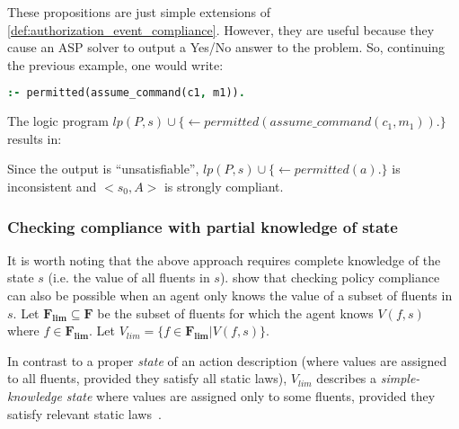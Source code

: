 These propositions are just simple extensions of \cref{def:authorization_event_compliance}.
However, they are useful because they cause an ASP solver to output a Yes/No answer to the problem.
So, continuing the previous example, one would write:
\begin{lstlisting}[language=Prolog]
:- permitted(assume_command(c1, m1)).
\end{lstlisting}
The logic program $lp(P, s) \cup \{ \leftarrow permitted(assume\_command(c_1, m_1)). \}$ results in:

Since the output is ``unsatisfiable'', $lp(P, s) \cup \{ \leftarrow permitted(a). \}$ is inconsistent and $<s_0, A>$ is strongly compliant.

\subsubsection{Checking compliance with partial knowledge of state}

It is worth noting that the above approach requires complete knowledge of the state $s$ (i.e. the value of all fluents in $s$).
\citet{gelfond_authorization_2008} show that checking policy compliance can also be possible when an agent only knows the value of a subset of fluents in $s$.
Let $\boldsymbol{F_{lim}} \subseteq \boldsymbol{F}$ be the subset of fluents for which the agent knows $V(f, s)$ where $f \in \boldsymbol{F_{lim}}$.
Let $V_{lim} = \{ f \in \boldsymbol{F_{lim}} | V(f, s)\}$.

\begin{definition}
    \label{def:simple_knowledge_state}
    In contrast to a proper \textit{state} of an action description (where values are assigned to all fluents, provided they satisfy all static laws), $V_{lim}$ describes a \textit{simple-knowledge state} where values are assigned only to some fluents, provided they satisfy relevant static laws~\citep{gelfond_authorization_2008}.
\end{definition}


